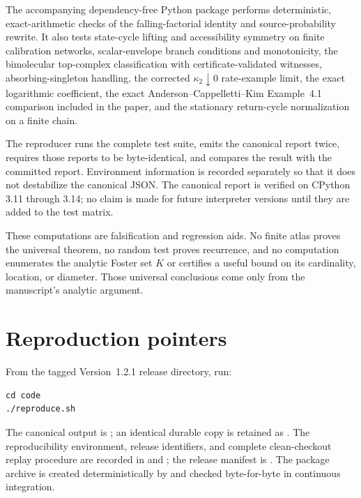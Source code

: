\documentclass[10pt]{article}
\begin{document}
The accompanying dependency-free Python package performs deterministic,
exact-arithmetic checks of the falling-factorial identity and
source-probability rewrite.  It also tests state-cycle lifting and accessibility
symmetry on finite calibration networks, scalar-envelope branch conditions and
monotonicity, the bimolecular top-complex classification with
certificate-validated witnesses, absorbing-singleton handling, the corrected
$\kappa_2\downarrow0$ rate-example limit, the exact logarithmic coefficient,
the exact Anderson--Cappelletti--Kim Example~4.1 comparison included in the
paper, and the stationary return-cycle normalization on a finite chain.

The reproducer runs the complete test suite, emits the canonical report twice,
requires those reports to be byte-identical, and compares the result with the
committed report.  Environment information is recorded separately so that it
does not destabilize the canonical JSON.  The canonical report is verified on
CPython 3.11 through 3.14; no claim is made for future interpreter versions
until they are added to the test matrix.

These computations are falsification and regression aids.  No finite atlas
proves the universal theorem, no random test proves recurrence, and no
computation enumerates the analytic Foster set $K$ or certifies a useful bound
on its cardinality, location, or diameter.  Those universal conclusions come
only from the manuscript's analytic argument.

\section{Reproduction pointers}

From the tagged Version~1.2.1 release directory, run:

\begin{verbatim}
cd code
./reproduce.sh
\end{verbatim}

The canonical output is
; an identical durable copy is retained
as .  The reproducibility environment,
release identifiers, and complete clean-checkout replay procedure are recorded
in  and ; the release manifest is
.  The package archive is created
deterministically by  and checked
byte-for-byte in continuous integration.
\end{document}
